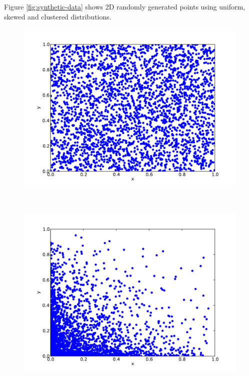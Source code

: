 Figure \ref{fig:synthetic-data} shows 2D randomly generated points using uniform, skewed and clustered distributions. 

\begin{figure}
		\begin{center}
			\begin{subfloat}{%
				\includegraphics[scale=0.25]{figures/uniform_distribution.pdf}
			}
			\end{subfloat}~
			\begin{subfloat}{%
				\includegraphics[scale=0.25]{figures/skewed_distribution.pdf}
			}
			\end{subfloat}~

\end{center}
\end{figure}
